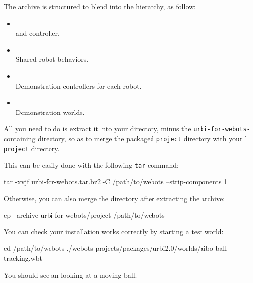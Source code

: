 The archive is structured to blend into the \webots hierarchy, as
follow:

\begin{itemize}
\item
  \\
  \usdk and \webots{} controller.
\item {}\\ Shared
  \us{} robot behaviors.
\item {}\\
  Demonstration controllers for each robot.
\item {}\\ Demonstration
  worlds.
\end{itemize}

All you need to do is extract it into your \webots directory, minus the
\texttt{urbi-for-webots-} containing directory, so as to
merge the packaged \texttt{project} directory with your \webots{}'
\texttt{project} directory.

This can be easily done with the following \texttt{tar} command:

\begin{shell}
tar -xvjf urbi-for-webots.tar.bz2 -C /path/to/webots --strip-components 1
\end{shell}

Otherwise, you can also merge the directory after extracting the archive:

\begin{shell}
cp --archive urbi-for-webots/project /path/to/webots
\end{shell}

You can check your installation works correctly by starting a test world:

\begin{shell}
cd /path/to/webots
./webots projects/packages/urbi2.0/worlds/aibo-ball-tracking.wbt
\end{shell}

You should see an \aibo{} looking at a moving ball.

\subsubsection{\macosx{}}

